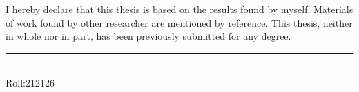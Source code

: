 I hereby declare that this thesis is based on the results found by myself. Materials
of work found by other researcher are mentioned by reference. This thesis, neither in
whole nor in part, has been previously submitted for any degree.

\vspace{1in}


\noindent   \rule{3.5cm}{1pt} \\
   Roll:212126 \\

